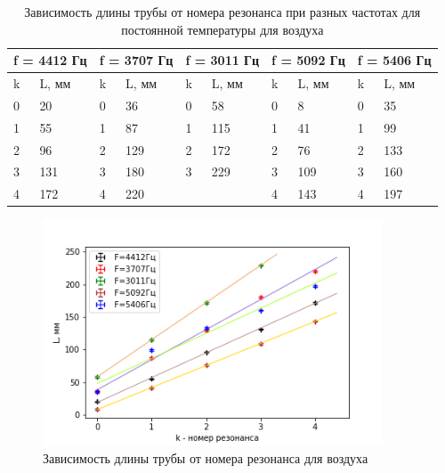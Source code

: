 \documentclass[a4paper,12pt]{article} %
\begin{document}
\begin{table}[h!]
\caption{Зависимость длины трубы от номера резонанса при разных частотах для постоянной температуры для воздуха}
\label{tbl:воздух}
\begin{tabular}{|ll|ll|ll|ll|ll|}
\hline
\multicolumn{2}{|l|}{f = 4412 Гц} & \multicolumn{2}{l|}{f = 3707 Гц} & \multicolumn{2}{l|}{f = 3011 Гц} & \multicolumn{2}{l|}{f = 5092 Гц} & \multicolumn{2}{l|}{f = 5406 Гц} \\ \hline
\multicolumn{1}{|l|}{k}  & L, мм  & \multicolumn{1}{l|}{k}  & L, мм  & \multicolumn{1}{l|}{k}  & L, мм  & \multicolumn{1}{l|}{k}  & L, мм  & \multicolumn{1}{l|}{k}  & L, мм  \\ \hline
\multicolumn{1}{|l|}{0}  & 20     & \multicolumn{1}{l|}{0}  & 36     & \multicolumn{1}{l|}{0}  & 58     & \multicolumn{1}{l|}{0}  & 8      & \multicolumn{1}{l|}{0}  & 35     \\ \hline
\multicolumn{1}{|l|}{1}  & 55     & \multicolumn{1}{l|}{1}  & 87     & \multicolumn{1}{l|}{1}  & 115    & \multicolumn{1}{l|}{1}  & 41     & \multicolumn{1}{l|}{1}  & 99     \\ \hline
\multicolumn{1}{|l|}{2}  & 96     & \multicolumn{1}{l|}{2}  & 129    & \multicolumn{1}{l|}{2}  & 172    & \multicolumn{1}{l|}{2}  & 76     & \multicolumn{1}{l|}{2}  & 133    \\ \hline
\multicolumn{1}{|l|}{3}  & 131    & \multicolumn{1}{l|}{3}  & 180    & \multicolumn{1}{l|}{3}  & 229    & \multicolumn{1}{l|}{3}  & 109    & \multicolumn{1}{l|}{3}  & 160    \\ \hline
\multicolumn{1}{|l|}{4}  & 172    & \multicolumn{1}{l|}{4}  & 220    & \multicolumn{1}{l|}{}   &        & \multicolumn{1}{l|}{4}  & 143    & \multicolumn{1}{l|}{4}  & 197    \\ \hline
\end{tabular}
\end{table}

\begin{figure}[h!]
\begin{center}
\includegraphics[width=0.9\textwidth]{Frequency_air}
\end{center}
\caption{Зависимость длины трубы от номера резонанса для воздуха} \label{частота_air}
\end{figure}
\end{document}
